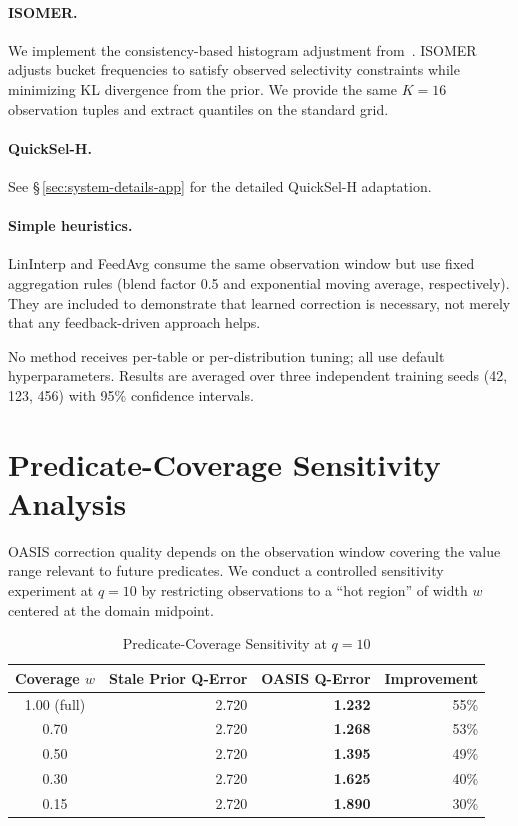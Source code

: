 \documentclass[runningheads]{llncs}
\begin{document}
\paragraph{ISOMER.}
We implement the consistency-based histogram adjustment
from~\cite{markl2007consistent}. ISOMER adjusts bucket frequencies to satisfy
observed selectivity constraints while minimizing KL divergence from the prior.
We provide the same $K{=}16$ observation tuples and extract quantiles on the
standard grid.

\paragraph{QuickSel-H.}
See \S\,\ref{sec:system-details-app} for the detailed QuickSel-H adaptation.

\paragraph{Simple heuristics.}
LinInterp and FeedAvg consume the same observation window but use fixed
aggregation rules (blend factor 0.5 and exponential moving average,
respectively). They are included to demonstrate that learned correction is
necessary, not merely that any feedback-driven approach helps.

No method receives per-table or per-distribution tuning; all use default
hyperparameters. Results are averaged over three independent training seeds
(42, 123, 456) with 95\% confidence intervals.



\section{Predicate-Coverage Sensitivity Analysis}
\label{sec:coverage-sensitivity-app}

OASIS correction quality depends on the observation window covering the value
range relevant to future predicates. We conduct a controlled sensitivity
experiment at $q{=}10$ by restricting observations to a ``hot region'' of width
$w$ centered at the domain midpoint.

\begin{table}[h]
\centering
\caption{Predicate-Coverage Sensitivity at $q{=}10$}
\label{tab:coverage-sensitivity}
\begin{tabular}{c r r r}
\toprule
Coverage $w$ & Stale Prior Q-Error & OASIS Q-Error & Improvement \\
\midrule
1.00 (full) & 2.720 & \textbf{1.232} & 55\% \\
0.70        & 2.720 & \textbf{1.268} & 53\% \\
0.50        & 2.720 & \textbf{1.395} & 49\% \\
0.30        & 2.720 & \textbf{1.625} & 40\% \\
0.15        & 2.720 & \textbf{1.890} & 30\% \\
\bottomrule
\end{tabular}
\end{table}
\end{document}
